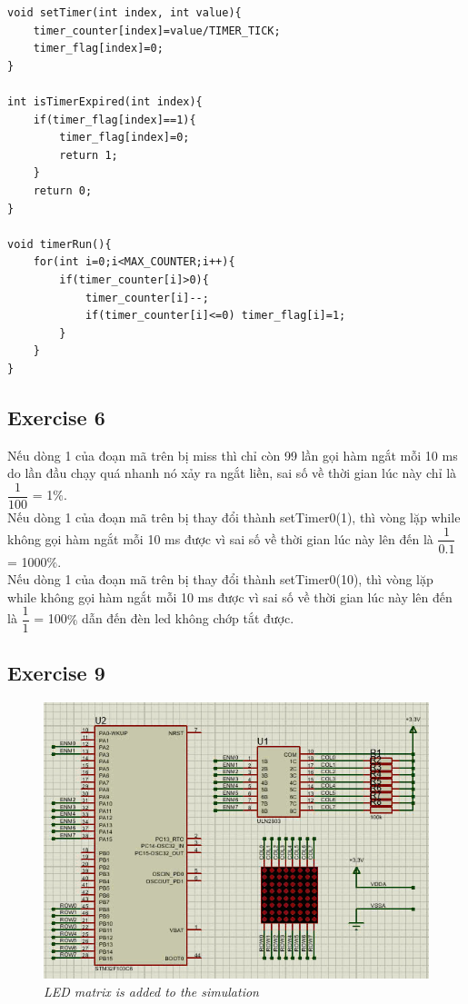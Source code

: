 \begin{lstlisting}[caption=software$\_$timer5.c]
void setTimer(int index, int value){
	timer_counter[index]=value/TIMER_TICK;
	timer_flag[index]=0;
}

int isTimerExpired(int index){
	if(timer_flag[index]==1){
		timer_flag[index]=0;
		return 1;
	}
	return 0;
}

void timerRun(){
	for(int i=0;i<MAX_COUNTER;i++){
		if(timer_counter[i]>0){
			timer_counter[i]--;
			if(timer_counter[i]<=0) timer_flag[i]=1;
		}
	}
}
\end{lstlisting}


\subsection{Exercise 6}
Nếu dòng 1 của đoạn mã trên bị miss thì chỉ còn 99 lần gọi hàm ngắt mỗi 10 ms do lần đầu chạy quá nhanh nó xảy ra ngắt liền, sai số về thời gian lúc này chỉ là $\dfrac{1}{100}$ = 1$\%$.\\
Nếu dòng 1 của đoạn mã trên bị thay đổi thành setTimer0(1), thì vòng lặp while không gọi hàm ngắt mỗi 10 ms được vì sai số về thời gian lúc này lên đến là $\dfrac{1}{0.1}$ = 1000$\%$.\\
Nếu dòng 1 của đoạn mã trên bị thay đổi thành setTimer0(10), thì vòng lặp while không gọi hàm ngắt mỗi 10 ms được vì sai số về thời gian lúc này lên đến là $\dfrac{1}{1}$ = 100$\%$ dẫn đến đèn led không chớp tắt được.


\subsection{Exercise 9}
\begin{figure}[!htp]
    \centering
    \includegraphics[width=5.5in]{source/picture/bai_2/pic9.jpg}
    \caption{\textit{LED matrix is added to the simulation}}
    \label{bai2_pic9}
\end{figure}



